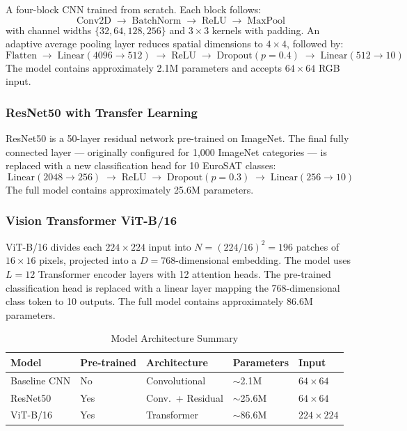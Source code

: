 \documentclass[12pt, letterpaper]{article}
\begin{document}
A four-block CNN trained from scratch. Each block follows:
\[
    \text{Conv2D} \;\rightarrow\; \text{BatchNorm} \;\rightarrow\;
    \text{ReLU} \;\rightarrow\; \text{MaxPool}
\]
with channel widths $\{32, 64, 128, 256\}$ and $3 \times 3$ kernels with padding. An
adaptive average pooling layer reduces spatial dimensions to $4 \times 4$, followed by:
\[
    \text{Flatten} \;\rightarrow\; \text{Linear}(4096 \to 512) \;\rightarrow\;
    \text{ReLU} \;\rightarrow\; \text{Dropout}(p{=}0.4) \;\rightarrow\;
    \text{Linear}(512 \to 10)
\]
The model contains approximately 2.1M parameters and accepts $64 \times 64$ RGB input.

\subsubsection{ResNet50 with Transfer Learning}

ResNet50 \cite{he2016resnet} is a 50-layer residual network pre-trained on ImageNet.
The final fully connected layer --- originally configured for 1,000 ImageNet categories
--- is replaced with a new classification head for 10 EuroSAT classes:
\[
    \text{Linear}(2048 \to 256) \;\rightarrow\; \text{ReLU} \;\rightarrow\;
    \text{Dropout}(p{=}0.3) \;\rightarrow\; \text{Linear}(256 \to 10)
\]
The full model contains approximately 25.6M parameters.

\subsubsection{Vision Transformer ViT-B/16}

ViT-B/16 \cite{dosovitskiy2021vit} divides each $224 \times 224$ input into
$N = (224/16)^2 = 196$ patches of $16 \times 16$ pixels, projected into a
$D = 768$-dimensional embedding. The model uses $L = 12$ Transformer encoder layers
with 12 attention heads. The pre-trained classification head is replaced with a linear
layer mapping the 768-dimensional class token to 10 outputs. The full model contains
approximately 86.6M parameters.

\begin{table}[h!]
    \centering
    \caption{Model Architecture Summary}
    \label{tab:arch}
    \begin{tabular}{@{}L{3.2cm} C{2.5cm} C{3.2cm} C{2.5cm} C{2cm}@{}}
        \toprule
        \textbf{Model} & \textbf{Pre-trained} & \textbf{Architecture} &
        \textbf{Parameters} & \textbf{Input} \\
        \midrule
        Baseline CNN & No  & Convolutional        & $\sim$2.1M  & $64{\times}64$ \\
        ResNet50     & Yes & Conv.\ + Residual    & $\sim$25.6M & $64{\times}64$ \\
        ViT-B/16     & Yes & Transformer          & $\sim$86.6M & $224{\times}224$ \\
        \bottomrule
    \end{tabular}
\end{table}
\end{document}
